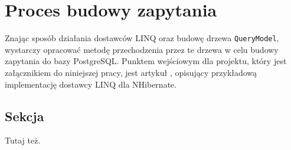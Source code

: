 \chapter{Proces budowy zapytania}
Znając sposób działania dostawców LINQ oraz budowę drzewa \texttt{QueryModel}, wystarczy opracować metodę przechodzenia przez te drzewa w celu budowy zapytania do bazy PostgreSQL. Punktem wejściowym dla projektu, który jest załącznikiem do niniejszej pracy, jest artykuł \cite{codeproject_nhibernate}, opisujący przykładową implementację dostawcy LINQ dla NHibernate.

\section{Sekcja}
Tutaj też.